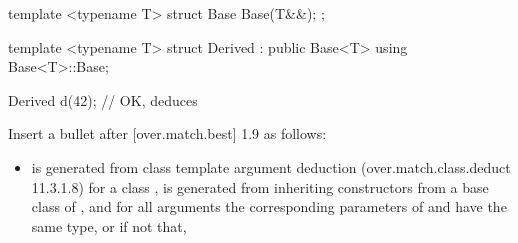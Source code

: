 \begin{adjustwidth}{0.5cm}{0.5cm}
\begin{addedblock}
\begin{example}
\begin{codeblock}
template <typename T> struct Base {
  Base(T&&);
};

template <typename T> struct Derived : public Base<T> {
  using Base<T>::Base;
}

Derived d(42);  // OK, deduces 
\end{codeblock}
\end{example}
\end{addedblock}
\end{adjustwidth}

Insert a bullet after [over.match.best] 1.9 as follows:

\begin{adjustwidth}{0.5cm}{0.5cm}
\begin{addedblock}
\begin{itemize}
\item {} is generated from class template argument deduction (over.match.class.deduct 11.3.1.8) for a class ,  is generated from inheriting constructors from a base class of , and for all arguments the corresponding parameters of  and  have the same type, or if not that,
\end{itemize}
\end{addedblock}
\end{adjustwidth}


\renewcommand{\bibname}{References}



